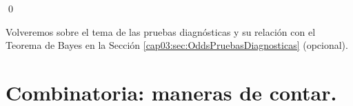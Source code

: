 \begin{ejemplo}
    \qed
\end{ejemplo}
Volveremos sobre el tema de las pruebas diagnósticas y su relación con el Teorema de Bayes en la Sección \ref{cap03:sec:OddsPruebasDiagnosticas} (opcional).

\section{Combinatoria: maneras de contar.}
\label{cap03:sec:Combinatoria}
\\

